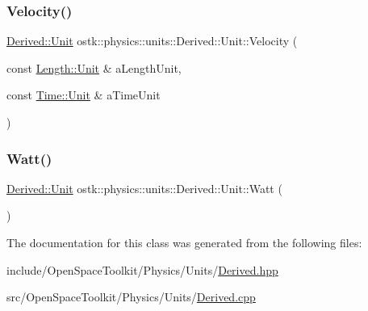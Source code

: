 \subsubsection{\texorpdfstring{Velocity()}{Velocity()}}
{\footnotesize\ttfamily \hyperlink{classostk_1_1physics_1_1units_1_1_derived_1_1_unit}{Derived\+::\+Unit} ostk\+::physics\+::units\+::\+Derived\+::\+Unit\+::\+Velocity (\begin{DoxyParamCaption}\item[{const \hyperlink{classostk_1_1physics_1_1units_1_1_length_a2664470a7eedf5d45c88861fe69badea}{Length\+::\+Unit} \&}]{a\+Length\+Unit,  }\item[{const \hyperlink{classostk_1_1physics_1_1units_1_1_time_aa961f0dbca7ec297e19e15e0dfa3bb4a}{Time\+::\+Unit} \&}]{a\+Time\+Unit }\end{DoxyParamCaption})\hspace{0.3cm}{\ttfamily [static]}}

\mbox{\label{classostk_1_1physics_1_1units_1_1_derived_1_1_unit_a3267139d7ebe53de971fc1c4afa51ab2}} 
\subsubsection{\texorpdfstring{Watt()}{Watt()}}
{\footnotesize\ttfamily \hyperlink{classostk_1_1physics_1_1units_1_1_derived_1_1_unit}{Derived\+::\+Unit} ostk\+::physics\+::units\+::\+Derived\+::\+Unit\+::\+Watt (\begin{DoxyParamCaption}{ }\end{DoxyParamCaption})\hspace{0.3cm}{\ttfamily [static]}}



The documentation for this class was generated from the following files\+:\begin{DoxyCompactItemize}
\item 
include/\+Open\+Space\+Toolkit/\+Physics/\+Units/\hyperlink{_derived_8hpp}{Derived.\+hpp}\item 
src/\+Open\+Space\+Toolkit/\+Physics/\+Units/\hyperlink{_derived_8cpp}{Derived.\+cpp}\end{DoxyCompactItemize}
